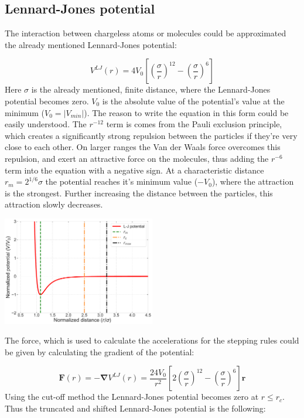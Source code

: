 \begin{multicols}{2}
\subsection{Lennard-Jones potential}
The interaction between chargeless atoms or molecules could be approximated the already mentioned Lennard-Jones potential:

\begin{equation}
V^{LJ} \left( r \right)
=
4 V_{0} \left[ \left( \frac{\sigma}{r} \right)^{12} - \left( \frac{\sigma}{r} \right)^{6} \right]
\end{equation}
Here $\sigma$ is the already mentioned, finite distance, where the Lennard-Jones potential becomes zero. $V_{0}$ is the absolute value of the potential's value at the minimum ($V_{0} = \left| V_{min} \right|$). The reason to write the equation in this form could be easily understood. The $r^{-12}$ term is comes from the Pauli exclusion principle, which creates a significantly strong repulsion between the particles if they're very close to each other. On larger ranges the Van der Waals force overcomes this repulsion, and exert an attractive force on the molecules, thus adding the $r^{-6}$ term into the equation with a negative sign. At a characteristic distance $r_{m} = 2^{1/6} \sigma$ the potential reaches it's minimum value ($-V_{0}$), where the attraction is the strongest. Further increasing the distance between the particles, this attraction slowly decreases. \par
\begin{center}
	\includegraphics[width=0.5\textwidth]{img_src/Lennard_Jones_Potential.pdf}
	 \label{fig:2}
\end{center}
The force, which is used to calculate the accelerations for the stepping rules could be given by calculating the gradient of the potential:

\begin{equation}
\boldsymbol{F} \left( r \right)
=
-\boldsymbol{\nabla} V^{LJ} \left( r \right)
=
\frac{24 V_{0}}{r^{2}} \left[ 2 \left( \frac{\sigma}{r} \right)^{12} - \left( \frac{\sigma}{r} \right)^{6} \right] \boldsymbol{r}
\end{equation}
Using the cut-off method the Lennard-Jones potential becomes zero at $r \leq r_{c}$. Thus the truncated and shifted Lennard-Jones potential is the following:


\end{multicols}
